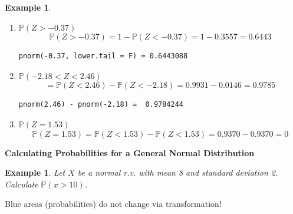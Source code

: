 \documentclass[12pt]{amsart}
\newtheorem{example}[theorem]{Example}
\newcommand{\bP}{\mathbb{P}}
\begin{document}
{\begin{example}
\begin{enumerate}
\vfill

\item $\bP( Z > -0.37 ) $
\color{blue}
$$\bP( Z > -0.37 ) = 1 - \bP( Z < -0.37 ) =  1 - 0.3557 = 0.6443$$

\begin{verbatim}
pnorm(-0.37, lower.tail = F) = 0.6443088
\end{verbatim}
\color{black}

\vfill


\item $\bP( -2.18 < Z < 2.46 )$
\color{blue}
$$= \bP( Z < 2.46 ) - \bP( Z < -2.18)
= 0.9931 - 0.0146
= 0.9785$$

\begin{verbatim}
pnorm(2.46) - pnorm(-2.18) =  0.9784244
\end{verbatim}
\color{black}

\vfill


\item $\bP(Z = 1.53 ) $
\color{blue}
$$\bP(Z = 1.53 ) 
= \bP( Z < 1.53 ) - \bP( Z < 1.53)
= 0.9370 - 0.9370 = 0$$
\color{black}

\end{enumerate}


\end{example} 


\newpage



\newpage
\textbf{Calculating Probabilities for a General Normal Distribution} \newline

\begin{example}  Let $X$ be a normal r.v. with mean 8 and standard deviation 2.  \newline
Calculate $\bP(x>10)$.
\end{example} 

\color{blue}
Blue areas (probabilities) do not change via transformation!
\color{black}

}
\end{document}
